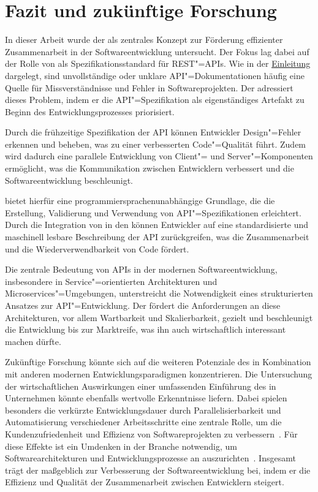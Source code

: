 \chapter{Fazit und zukünftige Forschung}
In dieser Arbeit wurde der \AFA als zentrales Konzept zur Förderung effizienter Zusammenarbeit in der Softwareentwicklung untersucht.
Der Fokus lag dabei auf der Rolle von \OA als Spezifikationsstandard für \ac{REST}"=\acp{API}.
Wie in der \hyperref[ch:introduction]{Einleitung} dargelegt, sind unvollständige oder unklare \ac{API}"=Dokumentationen häufig eine Quelle für Missverständnisse und Fehler in Softwareprojekten.
Der \AFA adressiert dieses Problem, indem er die \ac{API}"=Spezifikation als eigenständiges Artefakt zu Beginn des Entwicklungsprozesses priorisiert.

Durch die frühzeitige Spezifikation der \ac{API} können Entwickler Design"=Fehler erkennen und beheben, was zu einer verbesserten Code"=Qualität führt.
Zudem wird dadurch eine parallele Entwicklung von Client"= und Server"=Komponenten ermöglicht, was die Kommunikation zwischen Entwicklern verbessert und die Softwareentwicklung beschleunigt.

\OA bietet hierfür eine programmiersprachenunabhängige Grundlage, die die Erstellung, Validierung und Verwendung von \ac{API}"=Spezifikationen erleichtert.
Durch die Integration von \OA in den \AFA können Entwickler auf eine standardisierte und maschinell lesbare Beschreibung der \ac{API} zurückgreifen, was die Zusammenarbeit und die Wiederverwendbarkeit von Code fördert.

Die zentrale Bedeutung von \acp{API} in der modernen Softwareentwicklung, insbesondere in Service"=orientierten Architekturen und Microservices"=Umgebungen, unterstreicht die Notwendigkeit eines strukturierten Ansatzes zur \ac{API}"=Entwicklung.
Der \AFA fördert die Anforderungen an diese Architekturen, vor allem Wartbarkeit und Skalierbarkeit, gezielt und beschleunigt die Entwicklung bis zur Marktreife, was ihn auch wirtschaftlich interessant machen dürfte.

Zukünftige Forschung könnte sich auf die weiteren Potenziale des \AFAes in Kombination mit anderen modernen Entwicklungsparadigmen konzentrieren.
Die Untersuchung der wirtschaftlichen Auswirkungen einer umfassenden Einführung des \AFAes in Unternehmen könnte ebenfalls wertvolle Erkenntnisse liefern.
Dabei spielen besonders die verkürzte Entwicklungsdauer durch Parallelisierbarkeit und Automatisierung verschiedener Arbeitsschritte eine zentrale Rolle, um die Kundenzufriedenheit und Effizienz von Softwareprojekten zu verbessern~\cites[77]{bea22}[355,360]{de23}.
Für diese Effekte ist ein Umdenken in der Branche notwendig, um Softwarearchitekturen und Entwicklungsprozesse an \AF auszurichten~\cites[2]{kul23}[361]{de23}.
Insgesamt trägt der \AFA maßgeblich zur Verbesserung der Softwareentwicklung bei, indem er die Effizienz und Qualität der Zusammenarbeit zwischen Entwicklern steigert.